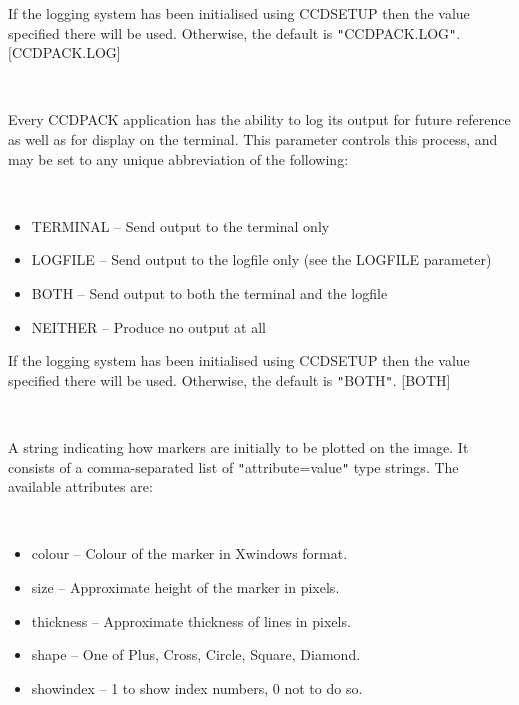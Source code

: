 \documentclass[twoside,11pt]{article}
\newcommand{\htmlref}[2]{#1}
\renewcommand{\_}{\texttt{\symbol{95}}}
\newcommand{\xroutine}[1]{\htmlref{{\sc #1}}{#1}}
\newcommand{\sstsubsection}[1]{ \item[{#1}] \mbox{} \\}
\newcommand{\sstitemlist}[1]{
  \mbox{} \\
  \vspace{-3.5ex}
  \begin{itemize}
     #1
  \end{itemize}
}
\newcommand{\sstitem}{\item}
\newcommand{\sstsubsection}[1]{\item[{#1}]}
\newcommand{\sstitemlist}[1]{
      \begin{itemize}
         #1
      \end{itemize}
      \\
   }
\newcommand{\sstitem}{\item}
\begin{document}
{{{         If the logging system has been initialised using \xroutine{CCDSETUP}
         then the value specified there will be used. Otherwise, the
         default is {\tt "}CCDPACK.LOG{\tt "}.
         [CCDPACK.LOG]
      }
      \sstsubsection{
         LOGTO = LITERAL (Read)
      }{
         Every CCDPACK application has the ability to log its output
         for future reference as well as for display on the terminal.
         This parameter controls this process, and may be set to any
         unique abbreviation of the following:
         \sstitemlist{

            \sstitem
               TERMINAL  -- Send output to the terminal only

            \sstitem
               LOGFILE   -- Send output to the logfile only (see the
                               LOGFILE parameter)

            \sstitem
               BOTH      -- Send output to both the terminal and the
                               logfile

            \sstitem
               NEITHER   -- Produce no output at all

         }
         If the logging system has been initialised using \xroutine{CCDSETUP}
         then the value specified there will be used. Otherwise, the
         default is {\tt "}BOTH{\tt "}.
         [BOTH]
      }
      \sstsubsection{
         MARKSTYLE = LITERAL (Read and Write)
      }{
         A string indicating how markers are initially to be plotted on
         the image.  It consists of a comma-separated list of
         {\tt "}attribute=value{\tt "} type strings.  The available attributes are:
         \sstitemlist{

            \sstitem
               colour     -- Colour of the marker in Xwindows format.

            \sstitem
               size       -- Approximate height of the marker in pixels.

            \sstitem
               thickness  -- Approximate thickness of lines in pixels.

            \sstitem
               shape      -- One of Plus, Cross, Circle, Square, Diamond.

            \sstitem
               showindex  -- 1 to show index numbers, 0 not to do so.

}}}}
\end{document}
